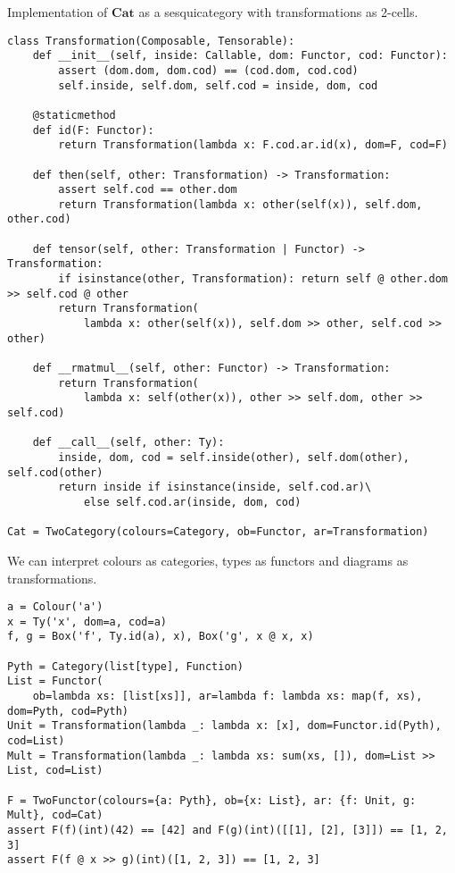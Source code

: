 \begin{python}\label{listing:Transformation}
{\normalfont Implementation of $\mathbf{Cat}$ as a sesquicategory with transformations as 2-cells.}

\begin{verbatim}
class Transformation(Composable, Tensorable):
    def __init__(self, inside: Callable, dom: Functor, cod: Functor):
        assert (dom.dom, dom.cod) == (cod.dom, cod.cod)
        self.inside, self.dom, self.cod = inside, dom, cod

    @staticmethod
    def id(F: Functor):
        return Transformation(lambda x: F.cod.ar.id(x), dom=F, cod=F)

    def then(self, other: Transformation) -> Transformation:
        assert self.cod == other.dom
        return Transformation(lambda x: other(self(x)), self.dom, other.cod)

    def tensor(self, other: Transformation | Functor) -> Transformation:
        if isinstance(other, Transformation): return self @ other.dom >> self.cod @ other
        return Transformation(
            lambda x: other(self(x)), self.dom >> other, self.cod >> other)

    def __rmatmul__(self, other: Functor) -> Transformation:
        return Transformation(
            lambda x: self(other(x)), other >> self.dom, other >> self.cod)

    def __call__(self, other: Ty):
        inside, dom, cod = self.inside(other), self.dom(other), self.cod(other)
        return inside if isinstance(inside, self.cod.ar)\
            else self.cod.ar(inside, dom, cod)

Cat = TwoCategory(colours=Category, ob=Functor, ar=Transformation)
\end{verbatim}
\end{python}

\begin{example}
We can interpret colours as categories, types as functors and diagrams as transformations.

\begin{verbatim}
a = Colour('a')
x = Ty('x', dom=a, cod=a)
f, g = Box('f', Ty.id(a), x), Box('g', x @ x, x)

Pyth = Category(list[type], Function)
List = Functor(
    ob=lambda xs: [list[xs]], ar=lambda f: lambda xs: map(f, xs), dom=Pyth, cod=Pyth)
Unit = Transformation(lambda _: lambda x: [x], dom=Functor.id(Pyth), cod=List)
Mult = Transformation(lambda _: lambda xs: sum(xs, []), dom=List >> List, cod=List)

F = TwoFunctor(colours={a: Pyth}, ob={x: List}, ar: {f: Unit, g: Mult}, cod=Cat)
assert F(f)(int)(42) == [42] and F(g)(int)([[1], [2], [3]]) == [1, 2, 3]
assert F(f @ x >> g)(int)([1, 2, 3]) == [1, 2, 3]
\end{verbatim}
\end{example}

